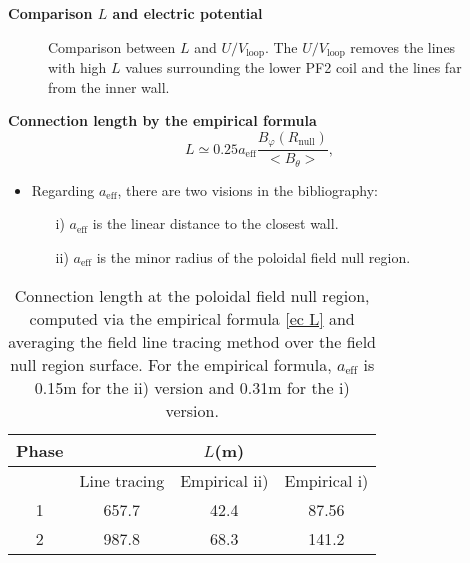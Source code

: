 \documentclass[10pt]{beamer}
\begin{document}

\begin{frame}{\bf Comparison $L$ and electric potential}
	\begin{figure}[htbp]
		\centering
		\hfill
		\caption{Comparison between $L$ and $U/V_\text{loop}$. The $U/V_\text{loop}$ removes the lines with high $L$ values surrounding the lower PF2 coil and the lines far from the inner wall.}
	\end{figure}
\end{frame}

\begin{frame}{\bf Connection length by the empirical formula}
	\begin{equation}\label{ec L}
L \simeq 0.25 a_\text{eff}\dfrac{B_\varphi(R_{\text{null}})}{<B_\theta>},
	\end{equation}
	\begin{itemize}
	\item Regarding $a_\text{eff}$, there are two visions in the bibliography:
%
		\begin{itemize}
			\item[i)] $a_\text{eff}$ is the linear distance to the closest wall.
			\item[ii)] $a_\text{eff}$ is the minor radius of the poloidal field null region.
		\end{itemize}
	\end{itemize}
	\begin{table}[htbp]
		\centering
		\begin{tabular}{|c|c|c|c|} \hline
Phase	 & \multicolumn{3}{|c|}{$L$(m)} \\ \hline
	& Line tracing & Empirical ii) & Empirical i) \\ \hline 
	1 & 657.7 & 42.4 & 87.56 \\ \hline
	2 & 987.8 & 68.3 & 141.2 \\ \hline
		\end{tabular}
		\caption{Connection length at the poloidal field null region, computed via the empirical formula \eqref{ec L} and averaging the field line tracing method over the field null region surface. For the empirical formula, $a_\text{eff}$ is 0.15m for the ii) version and 0.31m for the i) version.}
	\end{table}
\end{frame}
\end{document}
